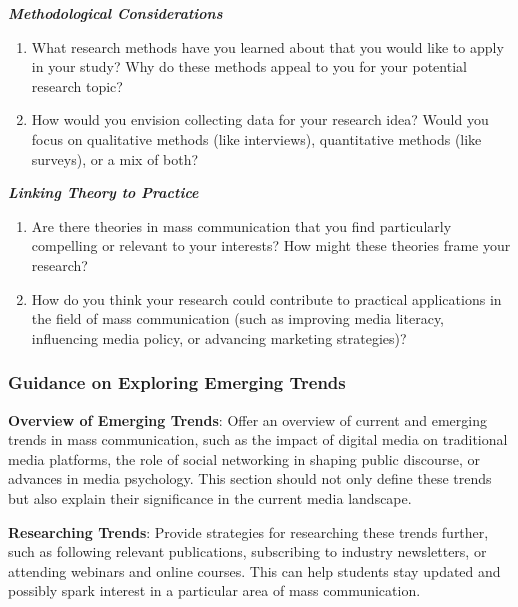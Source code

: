 \documentclass[
]{book}
\providecommand{\tightlist}{%
  \setlength{\itemsep}{0pt}\setlength{\parskip}{0pt}}
\begin{document}
\textbf{\emph{Methodological Considerations}}

\begin{enumerate}
\def\labelenumi{\arabic{enumi}.}
\setcounter{enumi}{8}
\tightlist
\item
  What research methods have you learned about that you would like to apply in your study? Why do these methods appeal to you for your potential research topic?
\item
  How would you envision collecting data for your research idea? Would you focus on qualitative methods (like interviews), quantitative methods (like surveys), or a mix of both?
\end{enumerate}

\textbf{\emph{Linking Theory to Practice}}

\begin{enumerate}
\def\labelenumi{\arabic{enumi}.}
\setcounter{enumi}{10}
\tightlist
\item
  Are there theories in mass communication that you find particularly compelling or relevant to your interests? How might these theories frame your research?
\item
  How do you think your research could contribute to practical applications in the field of mass communication (such as improving media literacy, influencing media policy, or advancing marketing strategies)?
\end{enumerate}

\hypertarget{guidance-on-exploring-emerging-trends}{%
\subsubsection*{Guidance on Exploring Emerging Trends}\label{guidance-on-exploring-emerging-trends}}

\textbf{Overview of Emerging Trends}: Offer an overview of current and emerging trends in mass communication, such as the impact of digital media on traditional media platforms, the role of social networking in shaping public discourse, or advances in media psychology. This section should not only define these trends but also explain their significance in the current media landscape.

\textbf{Researching Trends}: Provide strategies for researching these trends further, such as following relevant publications, subscribing to industry newsletters, or attending webinars and online courses. This can help students stay updated and possibly spark interest in a particular area of mass communication.
\end{document}
